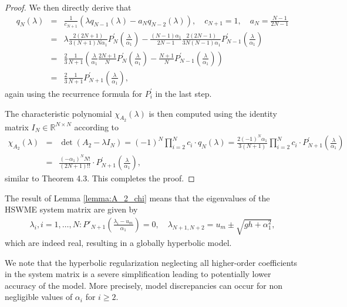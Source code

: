 \documentclass[a4paper, 11pt]{article}
\begin{document}
\begin{proof}
    We then directly derive that
    \begin{eqnarray}
        q_{N}(\lambda) &=& \frac{1}{c_{N+1}} \left( \lambda q_{N-1}(\lambda) - a_{N} q_{N-2}(\lambda) \right), \quad c_{N+1} =1, \quad a_N= \frac{N-1}{2N-1} \\
        &=& \lambda \frac{2(2N+1)}{3(N+1)N\alpha_1} P^{'}_{N}\left(\frac{\lambda}{\alpha_1}\right) - \frac{(N-1) \alpha_1}{2N-1} \frac{2(2N-1)}{3N (N-1) \alpha_1} P^{'}_{N-1}\left(\frac{\lambda}{\alpha_1}\right)  \\
        &=& \frac{2}{3} \frac{1}{N+1} \left( \frac{\lambda}{\alpha_1} \frac{2N+1}{N} P^{'}_{N}\left(\frac{\lambda}{\alpha_1}\right) - \frac{N+1 }{N} P^{'}_{N-1}\left(\frac{\lambda}{\alpha_1}\right) \right) \\
        &=& \frac{2}{3} \frac{1}{N+1} P^{'}_{N+1}\left(\frac{\lambda}{\alpha_1}\right),
    \end{eqnarray}
    again using the recurrence formula for $P^{'}_i$ in the last step.

    The characteristic polynomial $\chi_{A_2}(\lambda)$ is then computed using the identity matrix $I_N\in \mathbb{R}^{N \times N}$ according to
    \begin{eqnarray}
        \chi_{A_2}(\lambda) &=& \det(A_2- \lambda I_N) = (-1)^N \prod\limits_{i=2}^{N} c_i \cdot q_N(\lambda) = \frac{2(-1)^N \alpha_1}{3(N+1)} \prod\limits_{i=2}^{N} c_i \cdot P^{'}_{N+1}\left(\frac{\lambda}{\alpha_1}\right)\\
        &=& \frac{(-\alpha_1)^NN!}{(2N+1)!!} \cdot P^{'}_{N+1}\left(\frac{\lambda}{\alpha_1}\right),
    \end{eqnarray}
    similar to \cite{Bauerle2025} Theorem 4.3.
    This completes the proof.
\end{proof}

The result of Lemma \ref{lemma:A_2_chi} means that the eigenvalues of the HSWME system matrix are given by
\begin{eqnarray}\label{eq:HSWME_c_EV}
    \lambda_i, i=1,\ldots, N: P'_{N+1}\left(\frac{\lambda_i - u_m}{\alpha_1}\right)=0, \quad
    \lambda_{N+1,N+2} = u_m \pm \sqrt{gh + \alpha_1^2},
\end{eqnarray}
which are indeed real, resulting in a globally hyperbolic model.

We note that the hyperbolic regularization neglecting all higher-order coefficients in the system matrix is a severe simplification leading to potentially lower accuracy of the model. More precisely, model discrepancies can occur for non negligible values of $\alpha_i$ for $i\geq2$.
\end{document}
